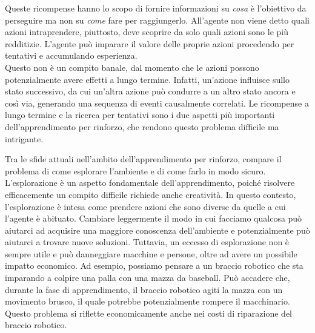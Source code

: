 Queste ricompense hanno lo scopo di fornire informazioni su \textit{cosa} è l'obiettivo da perseguire ma non su \textit{come} fare per raggiungerlo. All'agente non viene detto quali azioni intraprendere, piuttosto, deve scoprire da solo quali azioni sono le più redditizie. 
L'agente può imparare il valore delle proprie azioni procedendo per tentativi e accumulando esperienza.\\
Questo non è un compito banale, dal momento che le azioni possono potenzialmente avere effetti a lungo termine. Infatti, un'azione influisce sullo stato successivo, da cui un'altra azione può condurre a un altro stato ancora e così via, generando una sequenza di eventi causalmente correlati. Le ricompense a lungo termine e la ricerca per tentativi sono i due aspetti più importanti dell'apprendimento per rinforzo, che rendono questo problema difficile ma intrigante.

Tra le sfide attuali nell'ambito dell'apprendimento per rinforzo, compare il problema di come esplorare l'ambiente e di come farlo in modo sicuro. L'esplorazione è un aspetto fondamentale dell'apprendimento, poiché risolvere efficacemente un compito difficile richiede anche creatività. In questo contesto, l'esplorazione è intesa come prendere azioni che sono diverse da quelle a cui l'agente è abituato. Cambiare leggermente il modo in cui facciamo qualcosa può aiutarci ad acquisire una maggiore conoscenza dell'ambiente e potenzialmente può aiutarci a trovare nuove soluzioni. Tuttavia, un eccesso di esplorazione non è sempre utile e può danneggiare macchine e persone, oltre ad avere un possibile impatto economico. Ad esempio, possiamo pensare a un braccio robotico che sta imparando a colpire una palla con una mazza da baseball. Può accadere che, durante la fase di apprendimento, il braccio robotico agiti la mazza con un movimento brusco, il quale potrebbe potenzialmente rompere il macchinario. Questo problema si riflette economicamente anche nei costi di riparazione del braccio robotico.

